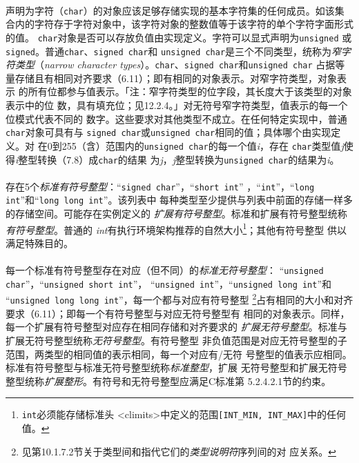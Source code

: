 \paragraph{}
声明为字符（\texttt{char}）的对象应该足够存储实现的基本字符集的任何成员。如该集
合内的字符存于字符对象中，该字符对象的整数值等于该字符的单个字符字面形式的值。
\texttt{char}对象是否可以存放负值由实现定义。字符可以显式声明为\texttt{unsigned}
或\texttt{signed}。普通\texttt{char}、\texttt{signed char}和
\texttt{unsigned char}是三个不同类型，统称为\textit{窄字符类型}（\textit{narrow
character types}）。\texttt{char}、\texttt{signed char}和\texttt{unsigned char}
占据等量存储且有相同对齐要求（6.11）；即有相同的对象表示。对窄字符类型，对象表示
的所有位都参与值表示。「注：窄字符类型的位字段，其长度大于该类型的对象表示中的位
数，具有填充位；见12.2.4。」对无符号窄字符类型，值表示的每一个位模式代表不同的
数字。这些要求对其他类型不成立。在任何特定实现中，普通\texttt{char}对象可具有与
\texttt{signed char}或\texttt{unsigned char}相同的值；具体哪个由实现定义。对
在0到255（含）范围内的\texttt{unsigned char}的每一个值\textit{i}，存在
\texttt{char}类型值\textit{j}使得\textit{i}整型转换（7.8）成\texttt{char}的结果
为\textit{j}，\textit{j}整型转换为\texttt{unsigned char}的结果为\textit{i}。

\paragraph{}
存在5个\textit{标准有符号整型}：``\texttt{signed char}''，``\texttt{short int}''
，``\texttt{int}''，``\texttt{long int}''和``\texttt{long long int}''。该列表中
每种类型至少提供与列表中前面的存储一样多的存储空间。可能存在实例定义的
\textit{扩展有符号整型}。标准和扩展有符号整型统称\textit{有符号整型}。普通的
\textit{int}有执行环境架构推荐的自然大小\footnote{\texttt{int}必须能存储标准头
<climits>中定义的范围\texttt{[INT\_MIN, INT\_MAX]}中的任何值。}；其他有符号整型
供以满足特殊目的。

\paragraph{}
每一个标准有符号整型存在对应（但不同）的\textit{标准无符号整型}：
``\texttt{unsigned char}''，``\texttt{unsigned short int}''，
``\texttt{unsigned int}''，``\texttt{unsigned long int}''和
``\texttt{unsigned long long int}''，每一个都与对应有符号整型
\footnote{见第10.1.7.2节关于类型间和指代它们的\textit{类型说明符}序列间的对
应关系。}占有相同的大小和对齐要求（6.11）；即每一个有符号整型与对应无符号整型有
相同的对象表示。同样，每一个扩展有符号整型对应存在相同存储和对齐要求的
\textit{扩展无符号整型}。标准与扩展无符号整型统称\textit{无符号整型}。有符号整型
非负值范围是对应无符号整型的子范围，两类型的相同值的表示相同，每一个对应有/无符
号整型的值表示应相同。标准有符号整型与标准无符号整型统称\textit{标准整型}，扩展
无符号整型和扩展无符号整型统称\textit{扩展整形}。有符号和无符号整型应满足C标准第
5.2.4.2.1节的约束。

